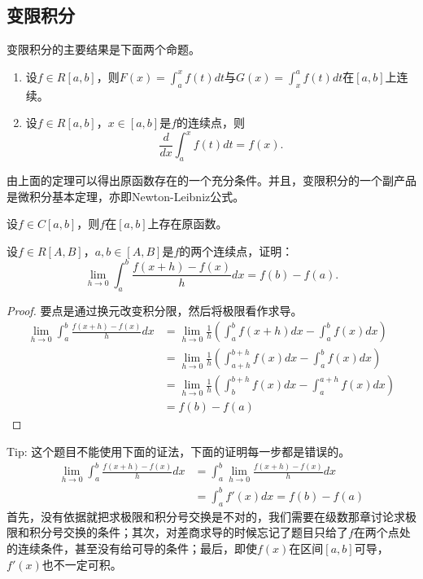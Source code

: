     \subsection{变限积分}
    变限积分的主要结果是下面两个命题。
    \begin{theorem}
        \begin{enumerate}
            \item 设$f\in R\left[a,b\right]$，则$F(x)=\int_{a}^{x}f(t)dt$与$G(x)=\int_{x}^{a}f(t)dt$在$\left[a,b\right]$上连续。
            \item 设$f\in R\left[a,b\right]$，$x\in\left[a,b\right]$是$f$的连续点，则$$\frac{d}{dx}\int_{a}^{x}f(t)dt=f(x).$$
        \end{enumerate}
    \end{theorem}
    由上面的定理可以得出原函数存在的一个充分条件。并且，变限积分的一个副产品是微积分基本定理，亦即Newton-Leibniz公式。
    \begin{theorem}[原函数存在定理]
        设$f\in C\left[a,b\right]$，则$f$在$\left[a,b\right]$上存在原函数。
    \end{theorem}
    \begin{example}
        设$f\in R\left[A,B\right]$，$a,b\in\left[A,B\right]$是$f$的两个连续点，证明：$$\lim\limits_{h\rightarrow 0}\int_{a}^{b}\frac{f(x+h)-f(x)}{h}dx=f(b)-f(a).$$
    \end{example}
    \begin{proof}
        要点是通过换元改变积分限，然后将极限看作求导。
        \begin{equation*}
            \begin{split}
                \lim\limits_{h\rightarrow 0}\int_{a}^{b}\frac{f(x+h)-f(x)}{h}dx
                &=\lim\limits_{h\rightarrow0}\frac{1}{h}\left(\int_{a}^{b}f(x+h)dx-\int_{a}^{b}f(x)dx\right)\\
                &=\lim\limits_{h\rightarrow0}\frac{1}{h}\left(\int_{a+h}^{b+h}f(x)dx-\int_{a}^{b}f(x)dx\right)\\
                &=\lim\limits_{h\rightarrow0}\frac{1}{h}\left(\int_{b}^{b+h}f(x)dx-\int_{a}^{a+h}f(x)dx\right)\\
                &=f(b)-f(a)
            \end{split}
        \end{equation*}
    \end{proof}
    Tip: 这个题目不能使用下面的证法，下面的证明每一步都是错误的。
    \begin{equation*}
        \begin{split}
            \lim\limits_{h\rightarrow 0}\int_{a}^{b}\frac{f(x+h)-f(x)}{h}dx
            &=\int_{a}^{b}\lim\limits_{h\rightarrow 0}\frac{f(x+h)-f(x)}{h}dx\\
            &=\int_{a}^{b}f'(x)dx=f(b)-f(a)
        \end{split}
    \end{equation*}
    首先，没有依据就把求极限和积分号交换是不对的，我们需要在级数那章讨论求极限和积分号交换的条件；其次，对差商求导的时候忘记了题目只给了$f$在两个点处的连续条件，甚至没有给可导的条件；最后，即使$f(x)$在区间$\left[a,b\right]$可导，$f'(x)$也不一定可积。
